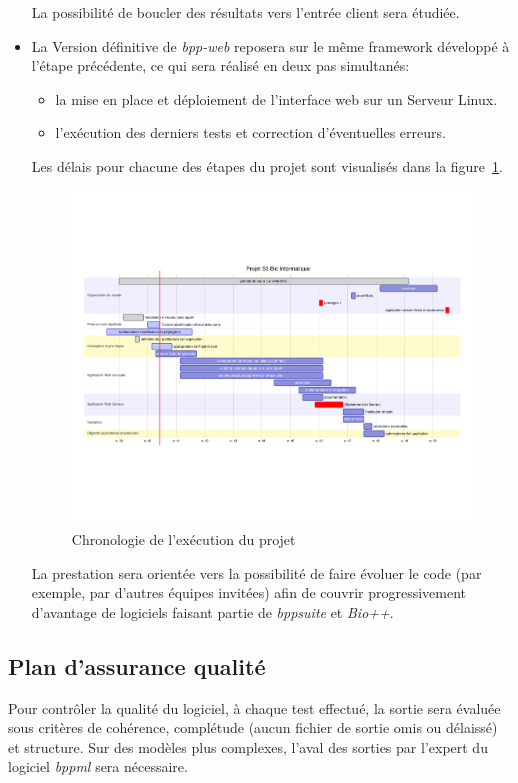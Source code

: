 \begin{itemize}
	La possibilité de boucler des résultats vers l'entrée client sera étudiée.
	 
	\item La Version définitive de \textit{bpp-web} reposera sur le même framework développé
	à l'étape précédente, ce qui sera réalisé en deux pas simultanés:
	\begin{itemize}
		\item la mise en place et déploiement de l'interface web sur un Serveur Linux.
		\item l'exécution des derniers tests et correction d'éventuelles erreurs.
	\end{itemize}
	
	Les délais pour chacune des étapes du projet sont visualisés dans la figure~\ref{planning}.
	\begin{figure}[ht!]
		\caption{\label{planning} Chronologie de l'exécution du projet}
		\includegraphics[trim={1.5cm 8cm 2cm 8cm},clip,width=\textwidth]{fig/mermaid1.pdf}
	\end{figure}
	
	La prestation sera orientée vers la possibilité de faire évoluer le code (par exemple, par d'autres équipes invitées) 
	afin de couvrir progressivement d'avantage de logiciels faisant partie de \textit{bppsuite} et \textit{Bio++}.
\end{itemize}


\subsection{Plan d'assurance qualité}
 Pour contrôler la qualité du logiciel, à chaque test effectué, la sortie sera  
 évaluée sous critères de cohérence, complétude (aucun fichier de sortie omis ou délaissé)
 et structure. Sur des modèles plus complexes, l'aval des sorties par l'expert du logiciel \textit{bppml} sera nécessaire.

